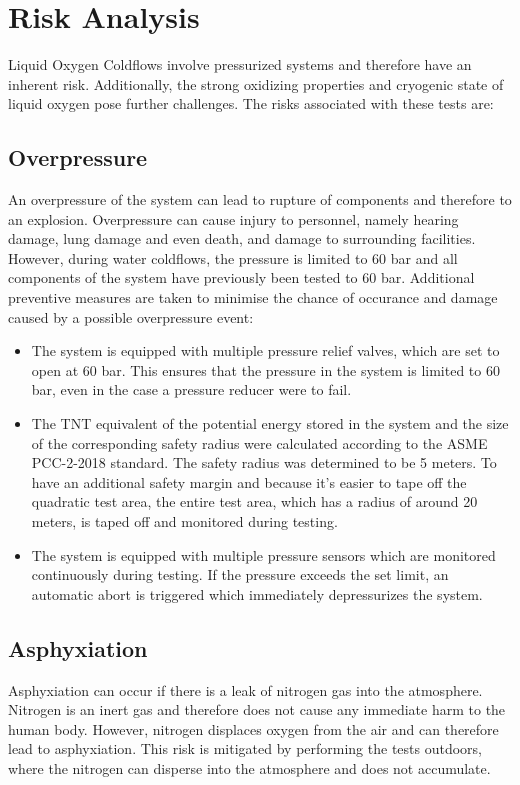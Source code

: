 \documentclass{article}
\begin{document}
\section{Risk Analysis}
Liquid Oxygen Coldflows involve pressurized systems and therefore have an inherent risk. Additionally, the strong oxidizing properties and cryogenic state of liquid oxygen pose further challenges. The risks associated with these tests are:
\subsection{Overpressure}
An overpressure of the system can lead to rupture of components and therefore to an explosion. Overpressure can cause injury to personnel, namely hearing damage, lung damage and even death, and damage to surrounding facilities. However, during water coldflows, the pressure is limited to 60 bar and all components of the system have previously been tested to 60 bar. Additional preventive measures are taken to minimise the chance of occurance and damage caused by a possible overpressure event:
\begin{itemize}
    \item The system is equipped with multiple pressure relief valves, which are set to open at 60 bar. This ensures that the pressure in the system is limited to 60 bar, even in the case a pressure reducer were to fail.
    \item The TNT equivalent of the potential energy stored in the system and the size of the corresponding safety radius were calculated according to the ASME PCC-2-2018 standard. The safety radius was determined to be 5 meters. To have an additional safety margin and because it's easier to tape off the quadratic test area, the entire test area, which has a radius of around 20 meters, is taped off and monitored during testing.
    \item The system is equipped with multiple pressure sensors which are monitored continuously during testing. If the pressure exceeds the set limit, an automatic abort is triggered which immediately depressurizes the system.
\end{itemize}
\subsection{Asphyxiation}
Asphyxiation can occur if there is a leak of nitrogen gas into the atmosphere. Nitrogen is an inert gas and therefore does not cause any immediate harm to the human body. However, nitrogen displaces oxygen from the air and can therefore lead to asphyxiation. This risk is mitigated by performing the tests outdoors, where the nitrogen can disperse into the atmosphere and does not accumulate.
\end{document}
